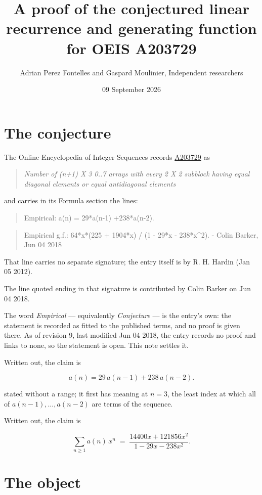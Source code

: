 \documentclass[11pt]{article}
\title{A proof of the conjectured linear recurrence and generating function for OEIS A203729}
\author{Adrian Perez Fontelles and Gaspard Moulinier, Independent researchers}
\date{09 September 2026}
\theoremstyle{definition}
\begin{document}
\maketitle
\section{The conjecture}

The Online Encyclopedia of Integer Sequences records \href{https://oeis.org/A203729}{A203729} as

\begin{quote}\itshape Number of (n+1) X 3 0..7 arrays with every 2 X 2 subblock having equal diagonal elements or equal antidiagonal elements\end{quote}

and carries in its Formula section the lines:

\begin{quote}\ttfamily Empirical: a(n) = 29*a(n-1) +238*a(n-2).\end{quote}

\begin{quote}\ttfamily Empirical g.f.: 64*x*(225 + 1904*x) / (1 - 29*x - 238*x\textasciicircum{}2). - Colin Barker, Jun 04 2018\end{quote}

That line carries no separate signature; the entry itself is by R. H. Hardin (Jan 05 2012).

The line quoted ending in that signature is contributed by Colin Barker on Jun 04 2018.

The word {\itshape Empirical} --- equivalently {\itshape Conjecture} --- is the entry's own: the statement is recorded as fitted to the published terms, and no proof is given there. As of revision 9, last modified Jun 04 2018, the entry records no proof and links to none, so the statement is open. This note settles it.

Written out, the claim is

\[a(n) = 29\,a(n-1) + 238\,a(n-2).\]

stated without a range; it first has meaning at $n = 3$, the least index at which all of $a(n-1),\dots,a(n-2)$ are terms of the sequence.

Written out, the claim is

\[\sum_{n \ge 1} a(n)\,x^n \;=\; \frac{14400x + 121856x^{2}}{1 - 29x - 238x^{2}}.\]

\section{The object}
\end{document}
